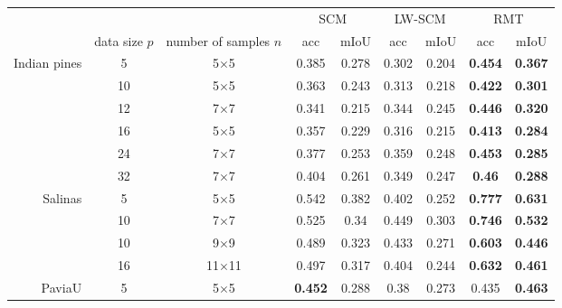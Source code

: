 \documentclass{article}
\theoremstyle{plain}
\theoremstyle{definition}
\theoremstyle{remark}
\begin{document}
\begin{table*}[t]
\centering
\begin{tabular}{rcccccccc}
                              &               &                       & \multicolumn{2}{c}{SCM} & \multicolumn{2}{c}{LW-SCM} & \multicolumn{2}{c}{RMT}         \\
                              & data size $p$ & number of samples $n$ & acc             & mIoU  & acc          & mIoU        & acc            & mIoU           \\ \cline{2-9} 
\multirow{4}{*}{Indian pines} & 5             & 5$\times$5            & 0.385           & 0.278 & 0.302        & 0.204       & \textbf{0.454} & \textbf{0.367} \\
                              & 10            & 5$\times$5            & 0.363           & 0.243 & 0.313        & 0.218       & \textbf{0.422} & \textbf{0.301} \\
                              & 12            & 7$\times$7            & 0.341           & 0.215 & 0.344        & 0.245       & \textbf{0.446} & \textbf{0.320} \\
                              & 16            & 5$\times$5            & 0.357           & 0.229 & 0.316        & 0.215       & \textbf{0.413} & \textbf{0.284} \\ & 24            & 7$\times$7            & 0.377           & 0.253 & 0.359        & 0.248       & \textbf{0.453} & \textbf{0.285} \\
                              & 32            & 7$\times$7            & 0.404           & 0.261 & 0.349        & 0.247       & \textbf{0.46} & \textbf{0.288} \\
                              \cline{2-9} 
\multirow{4}{*}{Salinas}      & 5             & 5$\times$5            & 0.542           & 0.382 & 0.402        & 0.252       & \textbf{0.777} & \textbf{0.631} \\
                              & 10            & 7$\times$7            & 0.525           & 0.34  & 0.449        & 0.303       & \textbf{0.746} & \textbf{0.532} \\
                              & 10            & 9$\times$9            & 0.489           & 0.323 & 0.433        & 0.271       & \textbf{0.603} & \textbf{0.446} \\
                              & 16            & 11$\times$11          & 0.497           & 0.317 & 0.404        & 0.244       & \textbf{0.632} & \textbf{0.461} \\ \cline{2-9} 
\multirow{2}{*}{PaviaU}       & 5             & 5$\times$5            & \textbf{0.452}  & 0.288 & 0.38         & 0.273       & 0.435          & \textbf{0.463} \\

\end{tabular}
\end{table*}
\end{document}
